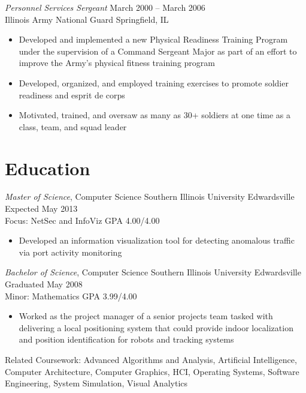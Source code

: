 \documentclass[margin,line]{resume}
\begin{document}
\begin{resume}
{\sl Personnel Services Sergeant}   \hfill   March 2000 -- March 2006\\
Illinois Army National Guard        \hfill   Springfield, IL
\begin{itemize} \itemsep -2pt %
\small\item Developed and implemented a new Physical Readiness Training Program under the supervision of a
            Command Sergeant Major as part of an effort to improve the Army's physical fitness training program
\small\item Developed, organized, and employed training exercises to promote soldier readiness and esprit de corps
\small\item Motivated, trained, and oversaw as many as 30+ soldiers at one time as a class, team, and squad leader
\end{itemize}

\section{Education}
{\small
  {\sl Master of Science}, Computer Science \hfill
  Southern Illinois University Edwardsville \hfill
  Expected May 2013\\
  Focus: NetSec and InfoViz \hfill
  GPA 4.00/4.00
}
\begin{itemize} \itemsep -2pt %
\small\item Developed an information visualization tool for detecting anomalous traffic via port activity monitoring
\end{itemize}

{\small
  {\sl Bachelor of Science}, Computer Science \hfill
  Southern Illinois University Edwardsville   \hfill
  Graduated May 2008\\
  Minor: Mathematics \hfill
  GPA 3.99/4.00
}
\begin{itemize} \itemsep -2pt %
\small\item Worked as the project manager of a senior projects team tasked with delivering a local positioning
            system that could provide indoor localization and position identification for robots and tracking systems
\end{itemize}

{\small
  Related Coursework: Advanced Algorithms and Analysis, Artificial Intelligence,
  Computer Architecture, Computer Graphics, HCI, Operating Systems, Software
  Engineering, System Simulation, Visual Analytics
}


\end{resume}
\end{document}
